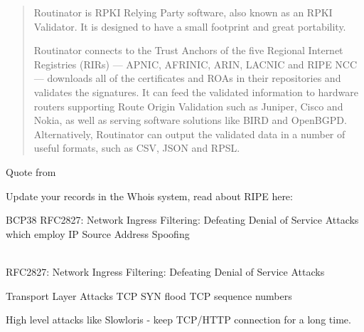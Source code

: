\documentclass[Screen16to9,17pt]{foils}
\begin{document}

\begin{quote}
  Routinator is RPKI Relying Party software, also known as an RPKI Validator. It is designed to have a small footprint and great portability.

Routinator connects to the Trust Anchors of the five Regional Internet Registries (RIRs) — APNIC, AFRINIC, ARIN, LACNIC and RIPE NCC — downloads all of the certificates and ROAs in their repositories and validates the signatures. It can feed the validated information to hardware routers supporting Route Origin Validation such as Juniper, Cisco and Nokia, as well as serving software solutions like BIRD and OpenBGPD. Alternatively, Routinator can output the validated data in a number of useful formats, such as CSV, JSON and RPSL.
\end{quote}

\begin{list1}
\item Quote from {\small{}}
\item Update your records in the Whois system, read about RIPE here:\\ {\small{}}
\end{list1}




BCP38 RFC2827: Network Ingress Filtering: Defeating Denial of Service Attacks which employ IP Source Address Spoofing

{\small{}}\\
RFC2827: Network Ingress Filtering: Defeating Denial of Service Attacks








\begin{list2}
\item Transport Layer Attacks TCP SYN flood TCP sequence numbers
\item High level attacks like Slowloris - keep TCP/HTTP connection for a long time.
\end{list2}
\end{document}
